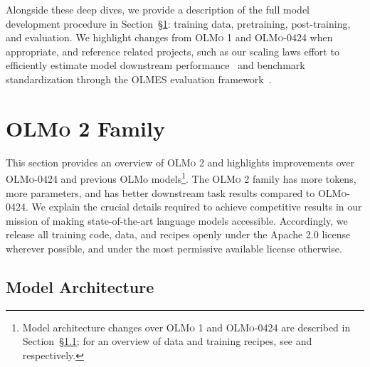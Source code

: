 \documentclass[table]{ai2style/ai2}
\newcommand{\olmozero}{\textsc{OLMo 1}\xspace}
\newcommand{\olmoapril}{\textsc{OLMo-0424}\xspace}
\newcommand{\olmotoo}{\textsc{OLMo 2}\xspace}
\begin{document}
Alongside these deep dives, we provide a description of the full model development procedure in Section~\S\ref{sec:olmo-family}: training data, pretraining, post-training, and evaluation. 
We highlight changes from \olmozero and \olmoapril when appropriate, and reference related projects, such as our scaling laws effort to efficiently estimate model downstream performance~\citep{bhagia2024establishingtaskscalinglaws} and benchmark standardization through the OLMES evaluation framework~\citep{olmes}.

\section{\olmotoo Family}
\label{sec:olmo-family}
This section provides an overview of \olmotoo and highlights improvements over \olmoapril and previous OLMo models\footnote{Model architecture changes over \olmozero and \olmoapril are described in Section~\S\ref{sec:architecture}; for an overview of data and training recipes, see \citet{Groeneveld2024OLMoAT} and \citet{olmo_blog} respectively.}. 
The \olmotoo family has more tokens, more parameters, and has better downstream task results compared to \olmoapril.
We explain the crucial details required to achieve competitive results in our mission of making state-of-the-art language models accessible.
Accordingly, we release all training code, data, and recipes openly under the Apache 2.0 license wherever possible, and under the most permissive available license otherwise.

\subsection{Model Architecture}
\label{sec:architecture}
\end{document}
